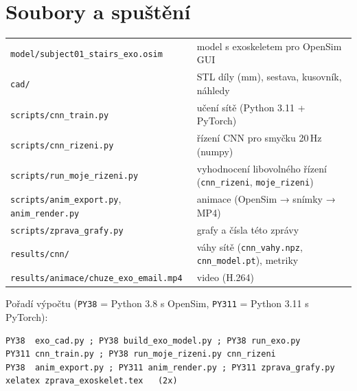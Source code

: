 \documentclass[11pt,a4paper]{article}
\begin{document}
\section{Soubory a spuštění}
\small
\begin{tabularx}{\textwidth}{l>{\raggedright\arraybackslash}X}
\toprule
\texttt{model/subject01\_stairs\_exo.osim} & model s exoskeletem pro OpenSim GUI\\
\texttt{cad/} & STL díly (mm), sestava, kusovník, náhledy\\
\texttt{scripts/cnn\_train.py} & učení sítě (Python 3.11 + PyTorch)\\
\texttt{scripts/cnn\_rizeni.py} & řízení CNN pro smyčku 20\,Hz (numpy)\\
\texttt{scripts/run\_moje\_rizeni.py} & vyhodnocení libovolného řízení (\texttt{cnn\_rizeni}, \texttt{moje\_rizeni})\\
\texttt{scripts/anim\_export.py}, \texttt{anim\_render.py} & animace (OpenSim → snímky → MP4)\\
\texttt{scripts/zprava\_grafy.py} & grafy a čísla této zprávy\\
\texttt{results/cnn/} & váhy sítě (\texttt{cnn\_vahy.npz}, \texttt{cnn\_model.pt}), metriky\\
\texttt{results/animace/chuze\_exo\_email.mp4} & video (H.264)\\
\bottomrule
\end{tabularx}

\medskip
\noindent Pořadí výpočtu (\texttt{PY38} = Python 3.8 s OpenSim, \texttt{PY311} = Python 3.11 s PyTorch):
\begin{verbatim}
PY38  exo_cad.py ; PY38 build_exo_model.py ; PY38 run_exo.py
PY311 cnn_train.py ; PY38 run_moje_rizeni.py cnn_rizeni
PY38  anim_export.py ; PY311 anim_render.py ; PY311 zprava_grafy.py
xelatex zprava_exoskelet.tex   (2x)
\end{verbatim}
\end{document}
